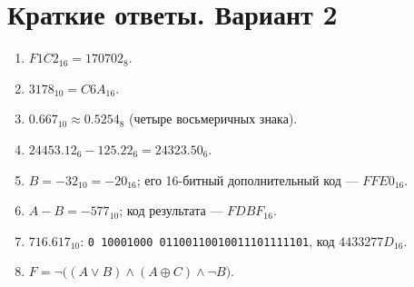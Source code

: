 \section*{Краткие ответы. Вариант 2}
\begin{enumerate}
    \item $F1C2_{16}=170702_8$.
    \item $3178_{10}=C6A_{16}$.
    \item $0.667_{10}\approx0.5254_8$ (четыре восьмеричных знака).
    \item $24453.12_6-125.22_6=24323.50_6$.
    \item $B=-32_{10}=-20_{16}$; его 16-битный дополнительный код --- $FFE0_{16}$.
    \item $A-B=-577_{10}$; код результата --- $FDBF_{16}$.
    \item $716.617_{10}$: \texttt{0 10001000 01100110010011101111101}, код $4433277D_{16}$.
    \item $F=\lnot\bigl((A\lor B)\land(A\oplus C)\land\lnot B\bigr)$.
\end{enumerate}
